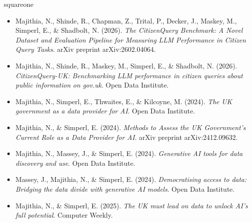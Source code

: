\documentclass[a4paper,10pt]{article}
\newcommand{\ulinecustom}[1]{%
  \uline{\phantom{#1}}%
  \llap{\contour{white}{#1}}%
}
\begin{document}
\begin{pubbox}[title={GENERATIVE AI \& BENCHMARKING}]{squareone}
\begin{itemize}
    \item Majithia, N., Shinde, R., Chapman, Z., Trital, P., Decker, J., Maskey, M., Simperl, E., \& Shadbolt, N. (2026). \textit{The CitizenQuery Benchmark: A Novel Dataset and Evaluation Pipeline for Measuring LLM Performance in Citizen Query Tasks}. arXiv preprint arXiv:2602.04064. \href{https://doi.org/10.48550/arXiv.2602.04064}{\ulinecustom{[link]}}
    \item Majithia, N., Shinde, R., Maskey, M., Simperl, E., \& Shadbolt, N. (2026). \textit{CitizenQuery-UK: Benchmarking LLM performance in citizen queries about public information on gov.uk}. Open Data Institute. \href{https://theodi.org/insights/reports/citizenquery-uk-benchmarking-llm-performance-in-citizen-queries-about-public-information-on-govuk/}{\ulinecustom{[link]}}
    \item Majithia, N., Simperl, E., Thwaites, E., \& Kilcoyne, M. (2024). \textit{The UK government as a data provider for AI}. Open Data Institute. \href{https://theodi.org/insights/reports/the-uk-government-as-a-data-provider-for-ai/}{\ulinecustom{[link]}}
    \item Majithia, N., \& Simperl, E. (2024). \textit{Methods to Assess the UK Government's Current Role as a Data Provider for AI}. arXiv preprint arXiv:2412.09632. \href{https://doi.org/10.48550/arXiv.2412.09632}{\ulinecustom{[link]}}
    \item Majithia, N., Massey, J., \& Simperl, E. (2024). \textit{Generative AI tools for data discovery and use}. Open Data Institute. \href{https://theodi.org/insights/reports/generative-ai-tools-for-data-discovery-and-use/}{\ulinecustom{[link]}}
    \item Massey, J., Majithia, N., \& Simperl, E. (2024). \textit{Democratising access to data: Bridging the data divide with generative AI models}. Open Data Institute. \href{https://theodi.org/insights/reports/democratising-access-to-data-bridging-the-data-divide-with-generative-ai-models/}{\ulinecustom{[link]}}
    \item Majithia, N., \& Simperl, E. (2025). \textit{The UK must lead on data to unlock AI's full potential}. Computer Weekly. \href{https://www.computerweekly.com/opinion/Why-the-UK-must-lead-on-data-to-unlock-AIs-full-potential}{\ulinecustom{[link]}}
\end{itemize}
\end{pubbox}
\end{document}

